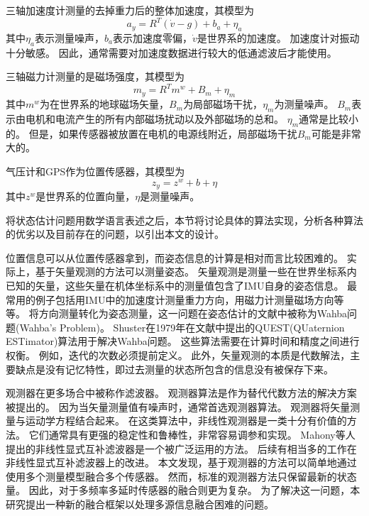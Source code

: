 \documentclass[
  type=master
]{gdutthesis}
\begin{document}
三轴加速度计测量的去掉重力后的整体加速度，其模型为
\begin{equation}\label{eq:accmodel}
	a_y=R^T(\dot{v}-g)+b_a+\eta_a
\end{equation}
其中$\eta_a$表示测量噪声，$b_a$表示加速度零偏，$\dot{v}$是世界系的加速度。
加速度计对振动十分敏感。
因此，通常需要对加速度数据进行较大的低通滤波后才能使用。

三轴磁力计测量的是磁场强度，其模型为
\begin{equation}\label{eq:magmodel}
	m_y=R^T m^w+B_m+\eta_m
\end{equation}
其中$m^w$为在世界系的地球磁场矢量，$B_m$为局部磁场干扰，$\eta_m$为测量噪声。
$B_m$表示由电机和电流产生的所有内部磁场扰动以及外部磁场的总和。
$\eta_m$通常是比较小的。
但是，如果传感器被放置在电机的电源线附近，局部磁场干扰$B_m$可能是非常大的。

气压计和GPS作为位置传感器，其模型为
\begin{equation}\label{eq:magmodel}
	z_y=z^w+b+\eta
\end{equation}
其中$z^w$是世界系的位置向量，$\eta$是测量噪声。

将状态估计问题用数学语言表述之后，本节将讨论具体的算法实现，分析各种算法的优劣以及目前存在的问题，以引出本文的设计。

位置信息可以从位置传感器拿到，而姿态信息的计算是相对而言比较困难的。
实际上，基于矢量观测的方法可以测量姿态。
矢量观测是测量一些在世界坐标系内已知的矢量，这些矢量在机体坐标系中的测量值包含了IMU自身的姿态信息。
最常用的例子包括用IMU中的加速度计测量重力方向，用磁力计测量磁场方向等等。
将方向测量转化为姿态测量，这一问题在姿态估计的文献中被称为Wahba问题(Wahba's Problem)\cite{wahba1965least}。
Shuster在1979年在文献\parencite{shuster1981three}中提出的QUEST(QUaternion ESTimator)算法用于解决Wahba问题。
这些算法需要在计算时间和精度之间进行权衡。
例如，迭代的次数必须提前定义。
此外，矢量观测的本质是代数解法，主要缺点是没有记忆特性，即过去测量的状态所包含的信息没有被保存下来。

观测器在更多场合中被称作滤波器。
观测器算法是作为替代代数方法的解决方案被提出的。
因为当矢量测量值有噪声时，通常首选观测器算法。
观测器将矢量测量与运动学方程结合起来。
在这类算法中，非线性观测器是一类十分有价值的方法。
它们通常具有更强的稳定性和鲁棒性，非常容易调参和实现。
Mahony等人提出的非线性显式互补滤波器是一个被广泛运用的方法\cite{mahony2008nonlinear}。
后续有相当多的工作在非线性显式互补滤波器上的改进\cite{hua2010attitude,khosravian2016state}。
本文发现，基于观测器的方法可以简单地通过使用多个测量模型融合多个传感器。
然而，标准的观测器方法只保留最新的状态量。
因此，对于多频率多延时传感器的融合则更为复杂。
为了解决这一问题，本研究提出一种新的融合框架以处理多源信息融合困难的问题。
\end{document}
